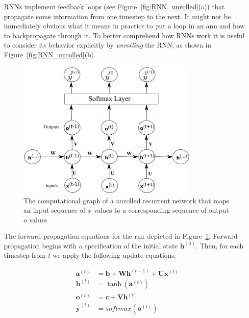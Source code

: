 RNNs implement feedback loops (see Figure~\ref{fig:RNN_unrolled}(a)) that propagate some information from one timestep to the next. It might not be immediately obvious what it means in practice to put a loop in an \gls{ann} and how to backpropagate through it. To better comprehend how RNNs work it is useful to consider its behavior explicitly by \emph{unrolling} the RNN, as shown in Figure~\ref{fig:RNN_unrolled}(b).



\begin{figure}
	\centering
	\includegraphics[width=0.8\textwidth]{figures/rnn_unrolling.eps}
	\caption{The computational graph of a unrolled recurrent network that maps an input sequence of $ x $ values to a corresponding sequence of output $ o $ values \label{fig:RNN_unrolling}}
\end{figure}

The forward propagation equations for the \gls{rnn} depicted in Figure~\ref{fig:RNN_unrolling}. Forward propagation begins with a specification of the initial state $ \textbf{h}^{(0)} $. Then, for each timestep from $ t $ we apply the following update equations:

\begin{equation} \label{rnn_unroll}
\begin{split}
	\textbf{a}^{(t)} &= \textbf{b} + \textbf{W}\textbf{h}^{(t-1)} + \textbf{U}\textbf{x}^{(t)} \\
	\textbf{h}^{(t)}&=\tanh(\textbf{a}^{(t)})\\
	\textbf{o}^{(t)}&= \textbf{c} + \textbf{V}\textbf{h}^{(t)} \\
	{\hat{\textbf{y}}}^{(t)} &= softmax(\textbf{o}^{(t)})
\end{split}
\end{equation}

